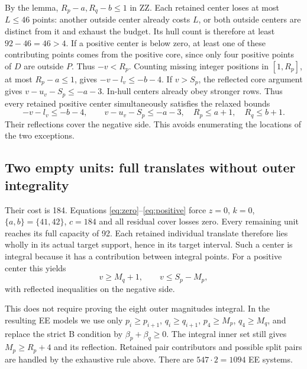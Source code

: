 \documentclass[11pt,a4paper]{article}
\begin{document}
By the lemma, $R_p-a,R_q-b\le1$ in ZZ. Each retained center loses at
most $L\le46$ points: another outside center already costs $L$, or both
outside centers are distinct from it and exhaust the budget. Its hull
count is therefore at least $92-46=46>4$.
If a positive center is below zero, at least one of these contributing
points comes from the positive core, since only four positive points
of $D$ are outside $P$. Thus $-v<R_p$. Counting missing integer
positions in $[1,R_p]$, at most $R_p-a\le1$, gives
$-v-l_v\le-b-4$. If $v>S_p$, the reflected core argument gives
$v-u_v-S_p\le-a-3$. In-hull centers already obey stronger rows.
Thus every retained positive center simultaneously satisfies the relaxed
bounds
\begin{equation}\label{eq:ZZ}
 -v-l_v\le-b-4,\qquad v-u_v-S_p\le-a-3,
 \quad R_p\le a+1,\quad R_q\le b+1.
\end{equation}
Their reflections cover the negative side. This avoids enumerating the
locations of the two exceptions.

\subsection{Two empty units: full translates without outer integrality}
Their cost is 184. Equations \eqref{eq:zero}--\eqref{eq:positive} force
$z=0$, $k=0$, $\{a,b\}=\{41,42\}$, $c=184$ and all residual cover
losses zero. Every remaining unit reaches its full capacity of 92.
Each retained individual translate therefore lies wholly in its actual
target support, hence in its target interval. Such a center is integral
because it has a contribution between integral points. For a positive
center this yields
\begin{equation}\label{eq:full}
 v\ge M_q+1,\qquad v\le S_p-M_p,
\end{equation}
with reflected inequalities on the negative side.

This does not require proving the eight outer magnitudes integral.
In the resulting EE models we use only
$p_i\ge p_{i+1}$, $q_i\ge q_{i+1}$, $p_4\ge M_p$, $q_4\ge M_q$,
and replace the strict B condition by $\beta_p+\beta_q\ge0$.
The integral inner set still gives $M_p\ge R_p+4$ and its reflection.
Retained pair contributors and possible split pairs are handled by the
exhaustive rule above. There are $547\cdot2=1094$ EE systems.
\end{document}
